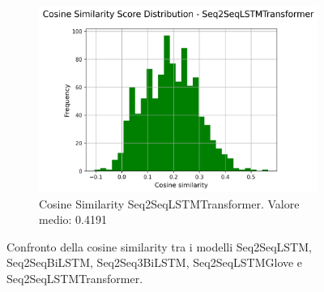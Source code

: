 \begin{figure}[H]
    \hfill
    \begin{subfigure}{0.22\textwidth}
        \centering
        \includegraphics[width=\textwidth]{media/Seq2SeqLSTMTransformer_cosine_similarity_scores.png}
        \caption{Cosine Similarity Seq2SeqLSTMTransformer. Valore medio: 0.4191}
    \end{subfigure}

    \caption{Confronto della cosine similarity tra i modelli Seq2SeqLSTM, Seq2SeqBiLSTM, Seq2Seq3BiLSTM, Seq2SeqLSTMGlove e Seq2SeqLSTMTransformer.}
    \label{fig:cosine_similarity_comparison}
\end{figure}
